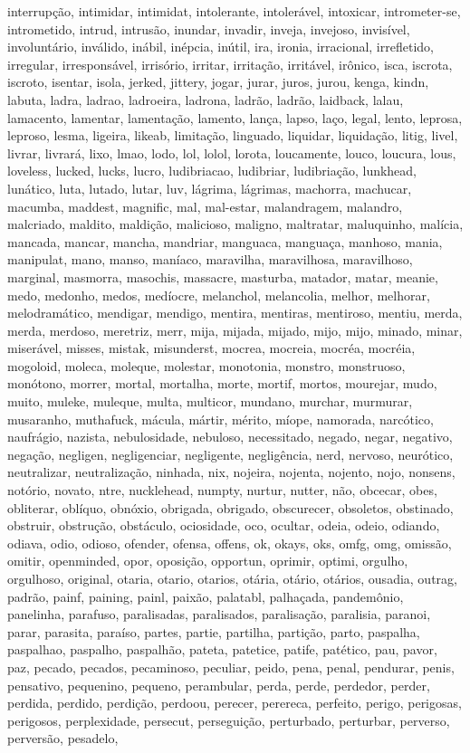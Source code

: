 interrupção, intimidar, intimidat, intolerante, intolerável, intoxicar, intrometer-se, intrometido, intrud, intrusão, inundar, invadir, inveja, invejoso, invisível, involuntário, inválido, inábil, inépcia, inútil, ira, ironia, irracional, irrefletido, irregular, irresponsável, irrisório, irritar, irritação, irritável, irônico, isca, iscrota, iscroto, isentar, isola, jerked, jittery, jogar, jurar, juros, jurou, kenga, kindn, labuta, ladra, ladrao, ladroeira, ladrona, ladrão, ladrão, laidback, lalau, lamacento, lamentar, lamentação, lamento, lança, lapso, laço, legal, lento, leprosa, leproso, lesma, ligeira, likeab, limitação, linguado, liquidar, liquidação, litig, livel, livrar, livrará, lixo, lmao, lodo, lol, lolol, lorota, loucamente, louco, loucura, lous, loveless, lucked, lucks, lucro, ludibriacao, ludibriar, ludibriação, lunkhead, lunático, luta, lutado, lutar, luv, lágrima, lágrimas, machorra, machucar, macumba, maddest, magnific, mal, mal-estar, malandragem, malandro, malcriado, maldito, maldição, malicioso, maligno, maltratar, maluquinho, malícia, mancada, mancar, mancha, mandriar, manguaca, manguaça, manhoso, mania, manipulat, mano, manso, maníaco, maravilha, maravilhosa, maravilhoso, marginal, masmorra, masochis, massacre, masturba, matador, matar, meanie, medo, medonho, medos, medíocre, melanchol, melancolia, melhor, melhorar, melodramático, mendigar, mendigo, mentira, mentiras, mentiroso, mentiu, merda, merda, merdoso, meretriz, merr, mija, mijada, mijado, mijo, mijo, minado, minar, miserável, misses, mistak, misunderst, mocrea, mocreia, mocréa, mocréia, mogoloid, moleca, moleque, molestar, monotonia, monstro, monstruoso, monótono, morrer, mortal, mortalha, morte, mortif, mortos, mourejar, mudo, muito, muleke, muleque, multa, multicor, mundano, murchar, murmurar, musaranho, muthafuck, mácula, mártir, mérito, míope, namorada, narcótico, naufrágio, nazista, nebulosidade, nebuloso, necessitado, negado, negar, negativo, negação, negligen, negligenciar, negligente, negligência, nerd, nervoso, neurótico, neutralizar, neutralização, ninhada, nix, nojeira, nojenta, nojento, nojo, nonsens, notório, novato, ntre, nucklehead, numpty, nurtur, nutter, não, obcecar, obes, obliterar, oblíquo, obnóxio, obrigada, obrigado, obscurecer, obsoletos, obstinado, obstruir, obstrução, obstáculo, ociosidade, oco, ocultar, odeia, odeio, odiando, odiava, odio, odioso, ofender, ofensa, offens, ok, okays, oks, omfg, omg, omissão, omitir, openminded, opor, oposição, opportun, oprimir, optimi, orgulho, orgulhoso, original, otaria, otario, otarios, otária, otário, otários, ousadia, outrag, padrão, painf, paining, painl, paixão, palatabl, palhaçada, pandemônio, \\ panelinha, parafuso, paralisadas, paralisados, paralisação, paralisia, paranoi, parar, parasita, paraíso, partes, partie, partilha, partição, parto, paspalha, paspalhao, paspalho, paspalhão, pateta, patetice, patife, patético, pau, pavor, paz, pecado, pecados, pecaminoso, peculiar, peido, pena, penal, pendurar, penis, pensativo, pequenino, pequeno, perambular, perda, perde, perdedor, perder, perdida, perdido, perdição, perdoou, perecer, perereca, perfeito, perigo, perigosas, perigosos, perplexidade, persecut, perseguição, perturbado, perturbar, perverso, perversão, pesadelo, 